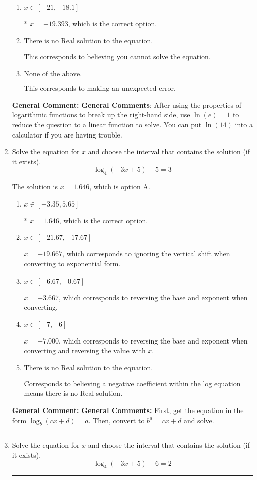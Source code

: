 \documentclass{extbook}[14pt]
\newcommand{\litem}[1]{\item #1

\rule{\textwidth}{0.4pt}}
\begin{document}
\begin{enumerate}
{\begin{enumerate}[label=\Alph*.]
$x = -3.745$, which corresponds to thinking you need to take the natural log of on the left before reducing.
\item \( x \in [-21, -18.1] \)

* $x = -19.393$, which is the correct option.
\item \( \text{There is no Real solution to the equation.} \)

This corresponds to believing you cannot solve the equation.
\item \( \text{None of the above.} \)

This corresponds to making an unexpected error.
\end{enumerate}

\textbf{General Comment:} \textbf{General Comments}: After using the properties of logarithmic functions to break up the right-hand side, use $\ln(e) = 1$ to reduce the question to a linear function to solve. You can put $\ln(14)$ into a calculator if you are having trouble.
}
\litem{
Solve the equation for $x$ and choose the interval that contains the solution (if it exists).
\[ \log_{4}{(-3x+5)}+5 = 3 \]

The solution is \( x = 1.646 \), which is option A.\begin{enumerate}[label=\Alph*.]
\item \( x \in [-3.35, 5.65] \)

* $x = 1.646$, which is the correct option.
\item \( x \in [-21.67, -17.67] \)

$x = -19.667$, which corresponds to ignoring the vertical shift when converting to exponential form.
\item \( x \in [-6.67, -0.67] \)

$x = -3.667$, which corresponds to reversing the base and exponent when converting.
\item \( x \in [-7, -6] \)

$x = -7.000$, which corresponds to reversing the base and exponent when converting and reversing the value with $x$.
\item \( \text{There is no Real solution to the equation.} \)

Corresponds to believing a negative coefficient within the log equation means there is no Real solution.
\end{enumerate}

\textbf{General Comment:} \textbf{General Comments:} First, get the equation in the form $\log_b{(cx+d)} = a$. Then, convert to $b^a = cx+d$ and solve.
}
\litem{
Solve the equation for $x$ and choose the interval that contains the solution (if it exists).
\[ \log_{4}{(-3x+5)}+6 = 2 \]

}
\end{enumerate}
\end{document}
